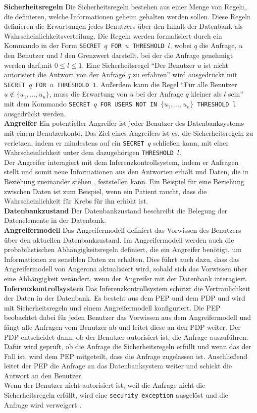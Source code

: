 \documentclass[german,version-2020-11]{uzl-thesis}
\begin{document}
\textbf{Sicherheitsregeln} Die Sicherheitsregeln bestehen aus einer Menge von Regeln, die definieren, welche Informationen geheim gehalten werden sollen. Diese Regeln definieren die Erwartungen jedes Benutzers über den Inhalt der Datenbank als Wahrscheinlichkeitsverteilung. Die Regeln werden formalisiert durch ein Kommando in der Form \texttt{SECRET $q$ FOR $u$ THRESHOLD $l$}, wobei $q$ die Anfrage, $u$ den Benutzer und $l$ den Grenzwert darstellt, bei der die Anfrage genehmigt werden darf,mit $0 \leq l \leq 1$. Eine Sicherheitsregel \enquote{Der Benutzer $u$ ist nicht autorisiert die Antwort von der Anfrage $q$ zu erfahren} wird ausgedrückt mit \texttt{SECRET $q$ FOR $u$ THRESHOLD 1}. Außerdem kann die Regel \enquote{Für alle Benutzer $u \notin \{u_1,\dots,u_n\}$, muss die Erwartung von $u$ bei der Anfrage $q$ kleiner als $l$ sein} mit dem Kommando \texttt{SECRET $q$ FOR USERS NOT IN $\{u_1,\dots,u_n\}$ THRESHOLD l} ausgedrückt werden.\\ 
\textbf{Angreifer} Ein potentieller Angreifer ist jeder Benutzer des Datenbanksystems mit einem Benutzerkonto. Das Ziel eines Angreifers ist es, die Sicherheitsregeln zu verletzen, indem er mindestens auf ein \texttt{SECRET $q$} schließen kann, mit einer Wahrscheinlichkeit unter dem dazugehörigen \texttt{THRESHOLD $l$}. \\ Der Angreifer interagiert mit dem Inferenzkontrollsystem, indem er Anfragen stellt und somit neue Informationen aus den Antworten erhält und Daten, die in Beziehung zueinander stehen , feststellen kann. Ein Beispiel für eine Beziehung zwischen Daten ist zum Beispiel, wenn ein Patient raucht, dass die Wahrscheinlichkeit für Krebs für ihn erhöht ist.  \\
\textbf{Datenbankzustand} Der Datenbankzustand beschreibt die Belegung der Datenelemente in der Datenbank. \\
\textbf{Angreifermodell} Das Angreifermodell definiert das Vorwissen des Benutzers über den aktuellen Datenbankzustand. Im Angreifermodell werden auch die probabilistischen Abhängigkeitsregeln definiert, die ein Angreifer benötigt, um Informationen zu sensiblen Daten zu erhalten. Dies führt auch dazu, dass das Angreifermodell von Angerona aktualisiert wird, sobald sich das Vorwissen über eine Abhängigkeit verändert, wenn der Angreifer mit der Datenbank interagiert.\\ 
\textbf{Inferenzkontrollsystem} Das Inferenzkontrollsystem schützt die Vertraulichkeit der Daten in der Datenbank. Es besteht aus dem PEP und dem PDP und wird mit Sicherheitsregeln und einem Angreifermodell konfiguriert. Die PEP beobachtet dabei für jeden Benutzer das Vorwissen aus dem Angreifermodell und fängt alle Anfragen vom Benutzer ab und leitet diese an den PDP weiter. Der PDP entscheidet dann, ob der Benutzer autorisiert ist, die Anfrage auszuführen. Dafür wird geprüft, ob die Anfrage die Sicherheitsregeln erfüllt und wenn das der Fall ist, wird dem PEP mitgeteilt, dass die Anfrage zugelassen ist. Anschließend leitet der PEP die Anfrage an das Datenbanksystem weiter und schickt die Antwort an den Benutzer. \\  Wenn der Benutzer nicht autorisiert ist, weil die Anfrage nicht die Sicherheitsregeln erfüllt, wird eine \texttt{security exception} ausgelöst und die Anfrage wird verweigert \cite{guarnieri2017securing}.
\end{document}
